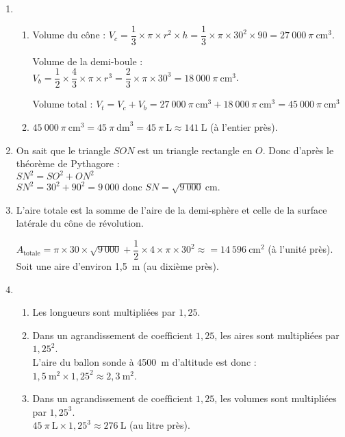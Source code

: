 \begin{enumerate}
	\item 
	\begin{enumerate}
		\item Volume du cône : $V_c = \dfrac{1}{3} \times \pi \times r^2 \times h = \dfrac{1}{3} \times \pi \times 30^2 \times 90 = 27~000~\pi~\text{cm}^3$.
		
		\medskip
		Volume de la demi-boule : $V_b = \dfrac{1}{2} \times \dfrac{4}{3} \times \pi \times r^3 = \dfrac{2}{3} \times \pi \times 30^3 = 18~000~\pi~\text{cm}^3$.
		
		\medskip
		Volume total : $V_t = V_c + V_b = 27~000~\pi~\text{cm}^3 + 18~000~\pi~\text{cm}^3 = 45~000~\pi~\text{cm}^3$
		
		\item $45~000~\pi~\text{cm}^3 = 45~\pi~\text{dm}^3=45~\pi~\text{L}\approx 141~\text{L}$ (à l'entier près).
	\end{enumerate}
	
	\item On sait que le triangle $SON$ est un triangle rectangle en $O$. Donc d'après le théorème de Pythagore :\\
	 $SN^2 = SO^2 + ON^2$\\
	 $SN^2 = 30^2 + 90^2 = 9~000$ donc $SN = \sqrt{9~000}~\text{cm}$.
	 
	 \item L'aire totale est la somme de l'aire de la demi-sphère et celle de la surface latérale du cône de révolution.
	 
	 \medskip
	 $A_\text{totale} = \pi \times 30 \times \sqrt{9~000} + \dfrac{1}{2} \times 4\times\pi \times 30^2 \approx = 14~596~\text{cm}^2$ (à l'unité près).\\
	 Soit une aire d'environ 1,5~m (au dixième près).
	 
	 \item
	 \begin{enumerate}
	 	\item Les longueurs sont multipliées par $1,25$.
	 	
	 	\item Dans un agrandissement de coefficient $1,25$, les aires sont multipliées par $1,25^2$.\\
	 	L'aire du ballon sonde à 4500~m d'altitude est donc : $1,5~\text{m}^2\times 1,25^2 \approx 2,3~\text{m}^2$.
	 	
	 	\item Dans un agrandissement de coefficient $1,25$, les volumes sont multipliées par $1,25^3$.\\
	 	$45~\pi~\text{L} \times 1,25^3 \approx 276~\text{L}$ (au litre près).
	 \end{enumerate}
	 

\end{enumerate}
